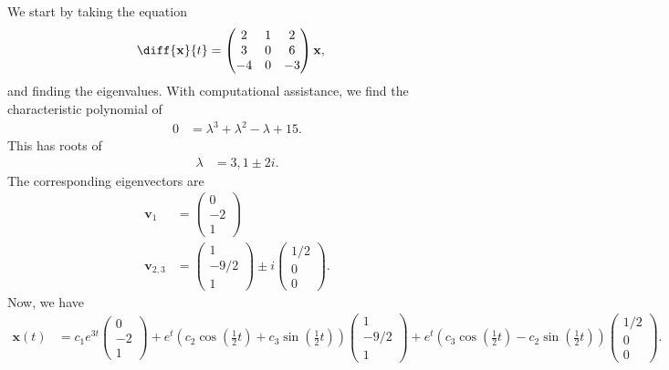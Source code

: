 \documentclass[10pt]{mypackage}
\begin{document}
\begin{solution}[8.2, Problem 40]
  We start by taking the equation
  \begin{align*}
    \diff{\mathbf{x}}{t} &= \begin{pmatrix}2 & 1 & 2 \\ 3 & 0 & 6 \\ -4 & 0 & -3\end{pmatrix} \mathbf{x},
  \end{align*}
  and finding the eigenvalues. With computational assistance, we find the characteristic polynomial of
  \begin{align*}
    0 &= \lambda^3 + \lambda^2 - \lambda + 15.
  \end{align*}
  This has roots of
  \begin{align*}
    \lambda &= 3,1\pm 2i.
  \end{align*}
  The corresponding eigenvectors are
  \begin{align*}
    \mathbf{v}_1 &= \begin{pmatrix}0\\-2\\1\end{pmatrix}\\
    \mathbf{v}_{2,3} &= \begin{pmatrix}1 \\-9/2\\1\end{pmatrix}\pm i \begin{pmatrix}1/2\\0\\0\end{pmatrix}.
  \end{align*}
  Now, we have
  \begin{align*}
    \mathbf{x}(t) &= c_1e^{3t} \begin{pmatrix}0\\-2\\1\end{pmatrix} + e^{t} \left( c_2\cos\left( \frac{1}{2}t \right) + c_3\sin\left( \frac{1}{2}t \right) \right) \begin{pmatrix}1\\-9/2\\1\end{pmatrix} + e^{t}\left( c_3\cos\left( \frac{1}{2}t \right) - c_2\sin\left( \frac{1}{2}t \right) \right) \begin{pmatrix}1/2\\0\\0\end{pmatrix}.
  \end{align*}
\end{solution}
\end{document}
